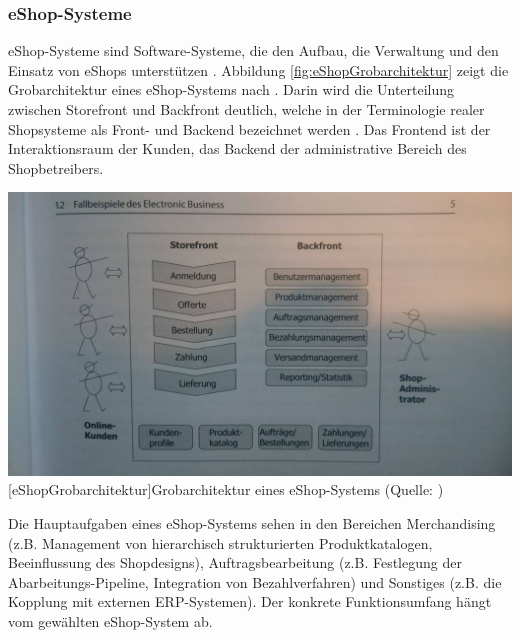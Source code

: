 \documentclass[12pt,a4paper,bibliography=totocnumbered,listof=totoc]{scrartcl}
\begin{document}
\subsubsection{eShop-Systeme}
\glqq eShop-Systeme sind Software-Systeme, die den Aufbau, die Verwaltung und den Einsatz von eShops unterstützen\grqq{} \citep{boles00}. Abbildung \ref{fig:eShopGrobarchitektur} zeigt die Grobarchitektur eines eShop-Systems nach \citeauthor{meier12}. Darin wird die Unterteilung zwischen Storefront und Backfront deutlich, welche in der Terminologie realer Shopsysteme als Front- und Backend bezeichnet werden \citep[vgl.][]{shopwareDoku}. Das Frontend ist der Interaktionsraum der Kunden, das Backend der administrative Bereich des Shopbetreibers.

\vspace{1em}
\begin{minipage}{\linewidth}
	\centering
	\includegraphics[width=0.7\linewidth]{Abbildungen/eShopGrobarchitektur.jpg}
	[eShopGrobarchitektur]{Grobarchitektur eines eShop-Systems (Quelle: \citet{meier12})}
	\label{fig:eShopGrobarchitektur}
\end{minipage}
\vspace{1em}

Die Hauptaufgaben eines eShop-Systems sehen \citet{boles00} in den Bereichen Merchandising (z.B. Management von hierarchisch strukturierten Produktkatalogen, Beeinflussung des Shopdesigns), Auftragsbearbeitung (z.B. Festlegung der Abarbeitungs-Pipeline, Integration von Bezahlverfahren) und Sonstiges (z.B. die Kopplung mit externen ERP-Systemen). Der konkrete Funktionsumfang hängt vom  gewählten eShop-System ab.
\end{document}
